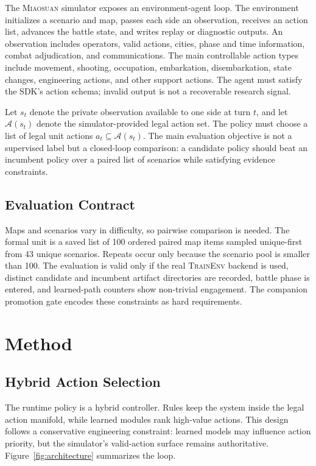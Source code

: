 \documentclass{article}
\newcommand{\env}{\textsc{TrainEnv}}
\begin{document}
The \textsc{Miaosuan} simulator exposes an environment-agent loop. The environment initializes a scenario and map, passes each side an observation, receives an action list, advances the battle state, and writes replay or diagnostic outputs. An observation includes operators, valid actions, cities, phase and time information, combat adjudication, and communications. The main controllable action types include movement, shooting, occupation, embarkation, disembarkation, state changes, engineering actions, and other support actions. The agent must satisfy the SDK's action schema; invalid output is not a recoverable research signal.

Let $s_t$ denote the private observation available to one side at turn $t$, and let $\mathcal{A}(s_t)$ denote the simulator-provided legal action set. The policy must choose a list of legal unit actions $a_t \subseteq \mathcal{A}(s_t)$. The main evaluation objective is not a supervised label but a closed-loop comparison: a candidate policy should beat an incumbent policy over a paired list of scenarios while satisfying evidence constraints.

\subsection{Evaluation Contract}

Maps and scenarios vary in difficulty, so pairwise comparison is needed. The formal unit is a saved list of 100 ordered paired map items sampled unique-first from 43 unique scenarios. Repeats occur only because the scenario pool is smaller than 100. The evaluation is valid only if the real \env{} backend is used, distinct candidate and incumbent artifact directories are recorded, battle phase is entered, and learned-path counters show non-trivial engagement. The companion promotion gate encodes these constraints as hard requirements.

\section{Method}

\subsection{Hybrid Action Selection}

The runtime policy is a hybrid controller. Rules keep the system inside the legal action manifold, while learned modules rank high-value actions. This design follows a conservative engineering constraint: learned models may influence action priority, but the simulator's valid-action surface remains authoritative. Figure~\ref{fig:architecture} summarizes the loop.
\end{document}
